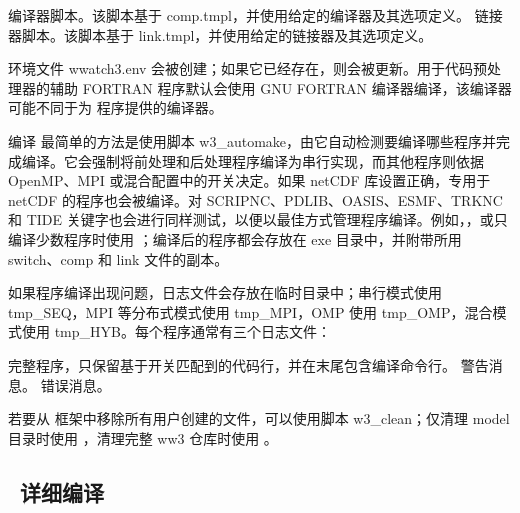 \begin{flist}
  {编译器脚本。该脚本基于 {\file comp.tmpl}，并使用给定的编译器及其选项定义。}
  {链接器脚本。该脚本基于 {\file link.tmpl}，并使用给定的链接器及其选项定义。}
\end{flist}

\vspace{\baselineskip}

环境文件 {\file wwatch3.env} 会被创建；如果它已经存在，则会被更新。用于代码预处理器的辅助 FORTRAN 程序默认会使用 GNU FORTRAN 编译器编译，该编译器可能不同于为 \ws{} 程序提供的编译器。


\vspace{\baselineskip} \noindent
编译 \ws{} 最简单的方法是使用脚本 {\file w3\_automake}，由它自动检测要编译哪些程序并完成编译。它会强制将前处理和后处理程序编译为串行实现，而其他程序则依据 OpenMP、MPI 或混合配置中的开关决定。如果 netCDF 库设置正确，专用于 netCDF 的程序也会被编译。对 SCRIPNC、PDLIB、OASIS、ESMF、TRKNC 和 TIDE 关键字也会进行同样测试，以便以最佳方式管理程序编译。例如，，或只编译少数程序时使用 ；编译后的程序都会存放在 {\dir exe} 目录中，并附带所用 switch、comp 和 link 文件的副本。

\vspace{\baselineskip} \noindent
如果程序编译出现问题，日志文件会存放在临时目录中；串行模式使用 {\dir tmp\_SEQ}，MPI 等分布式模式使用 {\dir tmp\_MPI}，OMP 使用 {\dir tmp\_OMP}，混合模式使用 {\dir tmp\_HYB}。每个程序通常有三个日志文件：

\begin{flist}
 {完整程序，只保留基于开关匹配到的代码行，并在末尾包含编译命令行。}
 {警告消息。}
 {错误消息。}
\end{flist}

若要从 \ws{} 框架中移除所有用户创建的文件，可以使用脚本 {\file w3\_clean}；仅清理 {\dir model} 目录时使用 ，清理完整 ww3 仓库时使用 。


\vssub
\subsection{~详细编译}
\vssub

